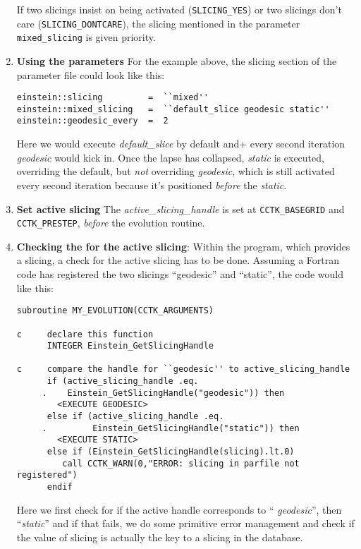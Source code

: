 \begin{enumerate}
If two slicings insist on being activated ({\tt SLICING\_YES}) or two
slicings don't care ({\tt SLICING\_DONTCARE}), the slicing mentioned in
the parameter {\tt mixed\_slicing} is given priority. 

\item{\bf Using the parameters}
For the example above, the slicing section of the parameter file could 
look like this:
\begin{verbatim}
einstein::slicing         =  ``mixed''
einstein::mixed_slicing   =  ``default_slice geodesic static''
einstein::geodesic_every  =  2
\end{verbatim}
Here we would execute {\em default\_slice} by default and+ every second
iteration {\em geodesic} would kick in. Once the lapse has collapsed,
{\em static} is executed, overriding the default, but {\em not}
overriding {\em geodesic}, which is still activated every second
iteration because it's positioned {\em before} the {\em static}.

\item{\bf Set active slicing} The {\em active\_slicing\_handle} is set
at {\tt CCTK\_BASEGRID} and {\tt CCTK\_PRESTEP}, {\em before} the
evolution routine.

\item{\bf Checking the for the active slicing}: Within the program,
which provides a slicing, a check for the active slicing has to be
done. Assuming a Fortran code has registered the two slicings
``geodesic'' and ``static'', the code would like this:
\begin{verbatim}
subroutine MY_EVOLUTION(CCTK_ARGUMENTS)

c     declare this function
      INTEGER Einstein_GetSlicingHandle

c     compare the handle for ``geodesic'' to active_slicing_handle
      if (active_slicing_handle .eq. 
     .    Einstein_GetSlicingHandle("geodesic")) then
        <EXECUTE GEODESIC>
      else if (active_slicing_handle .eq. 
     .         Einstein_GetSlicingHandle("static")) then
        <EXECUTE STATIC>
      else if (Einstein_GetSlicingHandle(slicing).lt.0)
         call CCTK_WARN(0,"ERROR: slicing in parfile not registered")
      endif
\end{verbatim}
Here we first check for if the active handle corresponds to ``{\em
geodesic}'', then ``{\em static}'' and if that fails, we do some
primitive error management and check if the value of slicing is
actually the key to a slicing in the database.

\end{enumerate}



